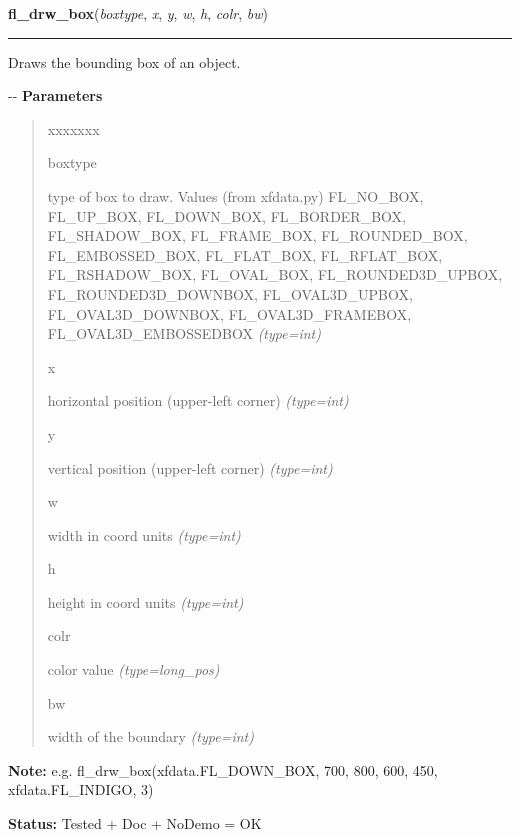 \hspace{.8\funcindent}\begin{boxedminipage}{\funcwidth}

    \raggedright \textbf{fl\_drw\_box}(\textit{boxtype}, \textit{x}, \textit{y}, \textit{w}, \textit{h}, \textit{colr}, \textit{bw})

    \vspace{-1.5ex}

    \rule{\textwidth}{0.5\fboxrule}
\setlength{\parskip}{2ex}

Draws the bounding box of an object.

-{}-
\setlength{\parskip}{1ex}
      \textbf{Parameters}
      \vspace{-1ex}

      \begin{quote}
        \begin{Ventry}{xxxxxxx}

          \item[boxtype]


type of box to draw. Values (from xfdata.py) FL\_NO\_BOX, FL\_UP\_BOX,
FL\_DOWN\_BOX, FL\_BORDER\_BOX, FL\_SHADOW\_BOX, FL\_FRAME\_BOX,
FL\_ROUNDED\_BOX, FL\_EMBOSSED\_BOX, FL\_FLAT\_BOX, FL\_RFLAT\_BOX,
FL\_RSHADOW\_BOX, FL\_OVAL\_BOX, FL\_ROUNDED3D\_UPBOX, FL\_ROUNDED3D\_DOWNBOX,
FL\_OVAL3D\_UPBOX, FL\_OVAL3D\_DOWNBOX, FL\_OVAL3D\_FRAMEBOX,
FL\_OVAL3D\_EMBOSSEDBOX
            {\it (type=int)}

          \item[x]


horizontal position (upper-left corner)
            {\it (type=int)}

          \item[y]


vertical position (upper-left corner)
            {\it (type=int)}

          \item[w]


width in coord units
            {\it (type=int)}

          \item[h]


height in coord units
            {\it (type=int)}

          \item[colr]


color value
            {\it (type=long\_pos)}

          \item[bw]


width of the boundary
            {\it (type=int)}

        \end{Ventry}

      \end{quote}

\textbf{Note:} 
e.g. fl\_drw\_box(xfdata.FL\_DOWN\_BOX, 700, 800, 600, 450,
xfdata.FL\_INDIGO, 3)


\textbf{Status:} 
Tested + Doc + NoDemo = OK


    \end{boxedminipage}


